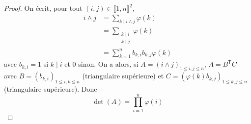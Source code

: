 \begin{proof}
    On écrit, pour tout $(i,j)\in\llbracket1,n\rrbracket^{2}$,
    \begin{align}
        i\wedge j
        &=\sum_{k\mid i\wedge j}\varphi(k)\\
        &=\sum_{\substack{k\mid i\\ k\mid j}}\varphi(k)\\
        &=\sum_{k=1}^{n}b_{k,i}b_{k,j}\varphi(k)
    \end{align}
    avec $b_{k,i}=1$ si $k\mid i$ et 0 sinon. On a alors, si $A=\left(i\wedge j\right)_{1\leqslant i,j\leqslant n}$, $A=B^{\mathsf{T}}C$ avec $B=(b_{k,i})_{1\leqslant i,k\leqslant n}$ (triangulaire supérieure) et $C=\left(\varphi(k)b_{k,j}\right)_{1\leqslant k,j\leqslant n}$ (triangulaire supérieure). Donc 
    \begin{equation}
        \boxed{\det(A)=\prod_{i=1}^{n}\varphi(i)}
    \end{equation}
\end{proof}

